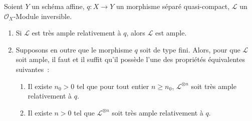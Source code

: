 \begin{proposition}[4.5.10]
\label{II.4.5.10-fr}
Soient $Y$ un schéma affine, $q:X\to Y$ un morphisme séparé quasi-compact,
$\mathcal{L}$ un $\mathcal{O}_X$-Module inversible.
\begin{enumerate}
  \item[\rm{(i)}] Si $\mathcal{L}$ est très ample relativement à $q$, alors
  $\mathcal{L}$ est ample.
  \item[\rm{(ii)}] Supposons en outre que le morphisme $q$ soit \textup{de type fini}.
  Alors, pour que $\mathcal{L}$ soit ample, il faut et il suffit qu'il possède
  l'une des propriétés équivalentes suivantes~:
  \begin{enumerate}
    \item[\rm{e)}] Il existe $n_0>0$ tel que pour tout entier $n\geq n_0$,
    $\mathcal{L}^{\otimes n}$ soit très ample relativement à $q$.
    \item[\rm{e')}] Il existe $n>0$ tel que $\mathcal{L}^{\otimes n}$ soit
    très ample relativement à $q$.
  \end{enumerate}
\end{enumerate}
\end{proposition}

